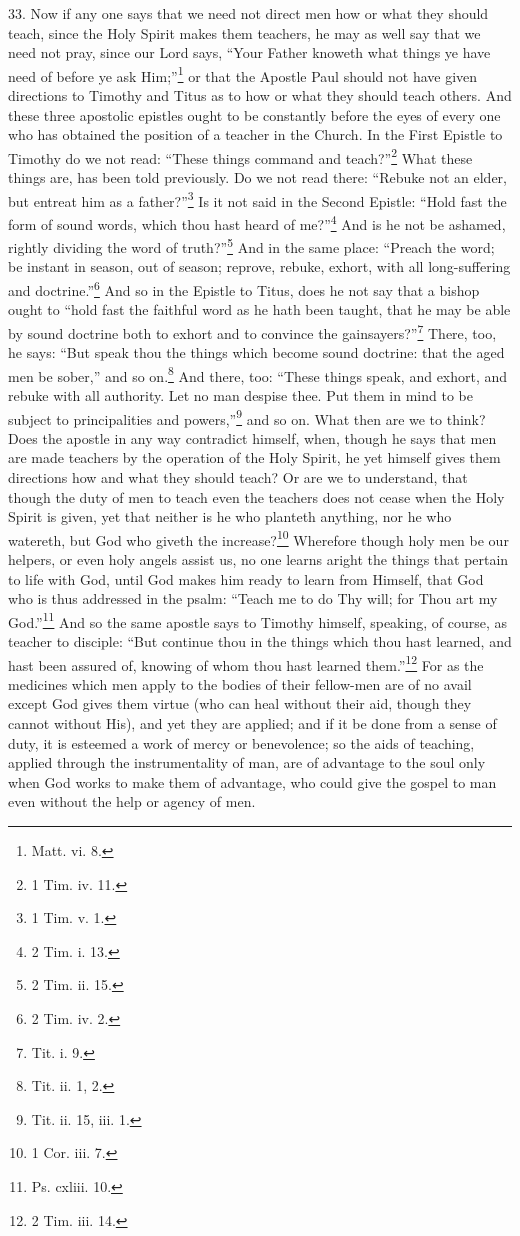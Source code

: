 33. Now if any one says that we need not direct men how or what they should teach, since the Holy Spirit makes them teachers, he may as well say that we need not pray, since our Lord says, “Your Father knoweth what things ye have need of before ye ask Him;”\footnote{Matt. vi. 8.} or that the Apostle Paul should not have given directions to Timothy and Titus as to how or what they should teach others. And these three apostolic epistles ought to be constantly before the eyes of every one who has obtained the position of a teacher in the Church. In the First Epistle to Timothy do we not read: “These things command and teach?”\footnote{1 Tim. iv. 11.} What these things are, has been told previously. Do we not read there: “Rebuke not an elder, but entreat him as a father?”\footnote{1 Tim. v. 1.} Is it not said in the Second Epistle: “Hold fast the form of sound words, which thou hast heard of me?”\footnote{2 Tim. i. 13.} And is he not be ashamed, rightly dividing the word of truth?”\footnote{2 Tim. ii. 15.} And in the same place: “Preach the word; be instant in season, out of season; reprove, rebuke, exhort, with all long-suffering and doctrine.”\footnote{2 Tim. iv. 2.} And so in the Epistle to Titus, does he not say that a bishop ought to “hold fast the faithful word as he hath been taught, that he may be able by sound doctrine both to exhort and to convince the gainsayers?”\footnote{Tit. i. 9.} There, too, he says: “But speak thou the things which become sound doctrine: that the aged men be sober,” and so on.\footnote{Tit. ii. 1, 2.} And there, too: “These things speak, and exhort, and rebuke with all authority. Let no man despise thee. Put them in mind to be subject to principalities and powers,”\footnote{Tit. ii. 15, iii. 1.} and so on. What then are we to think? Does the apostle in any way contradict himself, when, though he says that men are made teachers by the operation of the Holy Spirit, he yet himself gives them directions how and what they should teach? Or are we to understand, that though the duty of men to teach even the teachers does not cease when the Holy Spirit is given, yet that neither is he who planteth anything, nor he who watereth, but God who giveth the increase?\footnote{1 Cor. iii. 7.} Wherefore though holy men be our helpers, or even holy angels assist us, no one learns aright the things that pertain to life with God, until God makes him ready to learn from Himself, that God who is thus addressed in the psalm: “Teach me to do Thy will; for Thou art my God.”\footnote{Ps. cxliii. 10.} And so the same apostle says to Timothy himself, speaking, of course, as teacher to disciple: “But continue thou in the things which thou hast learned, and hast been assured of, knowing of whom thou hast learned them.”\footnote{2 Tim. iii. 14.} For as the medicines which men apply to the bodies of their fellow-men are of no avail except God gives them virtue (who can heal without their aid, though they cannot without His), and yet they are applied; and if it be done from a sense of duty, it is esteemed a work of mercy or benevolence; so the aids of teaching, applied through the instrumentality of man, are of advantage to the soul only when God works to make them of advantage, who could give the gospel to man even without the help or agency of men.

